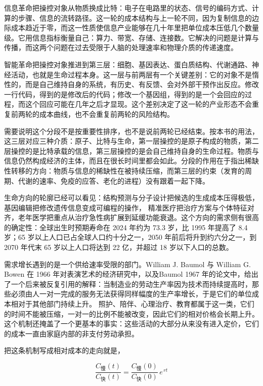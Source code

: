 信息革命把操控对象从物质换成比特：电子在电路里的状态、信号的编码方式、计算的步骤、信息的流转路径。这一轮的成本结构与上一轮不同，因为复制信息的边际成本趋近于零，而这一性质使信息产业能够在几十年里把单位成本压低几个数量级。它用信息指标衡量自己：算力、带宽、存储、连接数。它解决的问题是计算与传播，而这两个问题在过去受限于人脑的处理速率和物理介质的传递速度。

智能革命把操控对象推进到第三层：细胞、基因表达、蛋白质结构、代谢通路、神经活动，也就是生命过程本身。这一层与前两层有一个关键差别：它的对象不是惰性的，而是自己维持自身的系统，有历史、有反馈、会对外部干预作出反应。修改一行代码，得到的是修改后的代码；修改一个基因组，得到的是一个会回应的过程，而这个回应可能在几年之后才显现。这个差别决定了这一轮的产业形态不会重复前两轮的成本曲线，也不会重复前两轮的风险结构。

需要说明这个分段不是按重要性排序，也不是说前两轮已经结束。按本书的用法，这三层对应三种介质：原子、比特与生命，第一层操控的是原子构成的物质，第二层操控的是比特承载的信息，第三层操控的是会自己维持自身的生命过程。物质与信息仍然构成经济的主体，而且在很长时间里都会如此。分段的作用在于指出稀缺性转移的方向：物质与信息的稀缺性在被持续压缩，而第三层的约束（发育的周期、代谢的速率、免疫的应答、老化的进程）没有跟着一起下降。


生命方向的轮廓已经可以看见：结构预测与分子设计把候选的生成成本压得极低，基因编辑把修改遗传信息变成可编程的操作，\cite{jinek2012programmable} 精准医疗把治疗方案与个体特征对齐，老年医学把重点从治疗急性病扩展到延缓功能衰退。这个方向的需求侧有很高的确定性：全球出生时预期寿命在 2024 年约为 73.3 岁，比 1995 年提高了 8.4 岁；65 岁以上人口已占全球人口约十分之一，2050 年前后将升到约六分之一，到 2070 年代末 65 岁以上人口将达到 22 亿，并超过 18 岁以下人口的总数。\cite{un2024wpp}

需求增长遇到的是一个供给速率受限的部门。William J. Baumol 与 William G. Bowen 在 1966 年对表演艺术的经济研究中，以及Baumol 1967 年的论文中，给出了一个后来被反复引用的解释：当制造业的劳动生产率因为技术而持续提高时，那些必须由人一对一完成的服务无法获得同样幅度的生产率增长，于是它们的单位成本相对于其他部门持续上升。\cite{baumol1966performing,baumol1967macro} 照护、陪伴、心理治疗、教育都属于这一类，它们的时间不能被压缩，一对一的比例不能被改变，因此它们的相对价格会长期上升。这个机制还掩盖了一个更基本的事实：这些活动的大部分从来没有进入定价，它们的成本一直由家庭内部的非支付劳动承担。

把这条机制写成相对成本的走向就是，

\begin{equation}
\frac{C_{\text{慢}}(t)}{C_{\text{快}}(t)}=\frac{C_{\text{慢}}(0)}{C_{\text{快}}(0)}\,e^{\,r t}
\end{equation}

